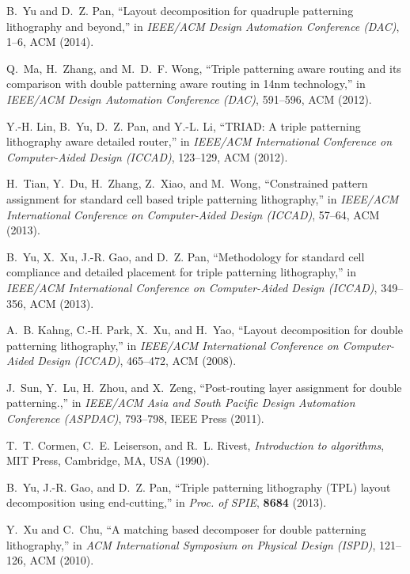 \documentclass[12pt]{spieman}
\theoremstyle{plain}
\begin{document}
\begin{spacing}{1}
\begin{thebibliography}{10}
B.~Yu and D.~Z. Pan, ``Layout decomposition for quadruple patterning
  lithography and beyond,'' in {\em IEEE/ACM Design Automation Conference
  (DAC)},  1--6, ACM  (2014).

Q.~Ma, H.~Zhang, and M.~D.~F. Wong, ``Triple patterning aware routing and its
  comparison with double patterning aware routing in 14nm technology,'' in {\em
  IEEE/ACM Design Automation Conference (DAC)},  591--596, ACM  (2012).

Y.-H. Lin, B.~Yu, D.~Z. Pan, and Y.-L. Li, ``{TRIAD}: A triple patterning
  lithography aware detailed router,'' in {\em IEEE/ACM International
  Conference on Computer-Aided Design (ICCAD)},  123--129, ACM  (2012).

H.~Tian, Y.~Du, H.~Zhang, Z.~Xiao, and M.~Wong, ``Constrained pattern
  assignment for standard cell based triple patterning lithography,'' in {\em
  IEEE/ACM International Conference on Computer-Aided Design (ICCAD)},  57--64,
  ACM  (2013).

B.~Yu, X.~Xu, J.-R. Gao, and D.~Z. Pan, ``Methodology for standard cell
  compliance and detailed placement for triple patterning lithography,'' in
  {\em IEEE/ACM International Conference on Computer-Aided Design (ICCAD)},
  349--356, ACM  (2013).

A.~B. Kahng, C.-H. Park, X.~Xu, and H.~Yao, ``Layout decomposition for double
  patterning lithography,'' in {\em IEEE/ACM International Conference on
  Computer-Aided Design (ICCAD)},  465--472, ACM  (2008).

J.~Sun, Y.~Lu, H.~Zhou, and X.~Zeng, ``Post-routing layer assignment for double
  patterning.,'' in {\em IEEE/ACM Asia and South Pacific Design Automation
  Conference (ASPDAC)},  793--798, IEEE Press  (2011).

T.~T. Cormen, C.~E. Leiserson, and R.~L. Rivest, {\em Introduction to
  algorithms}, MIT Press, Cambridge, MA, USA  (1990).

B.~Yu, J.-R. Gao, and D.~Z. Pan, ``Triple patterning lithography ({TPL}) layout
  decomposition using end-cutting,'' in {\em Proc. of SPIE},   {\bf 8684}
  (2013).

Y.~Xu and C.~Chu, ``A matching based decomposer for double patterning
  lithography,'' in {\em ACM International Symposium on Physical Design
  (ISPD)},  121--126, ACM  (2010).


\end{thebibliography}
\end{spacing}
\end{document}
